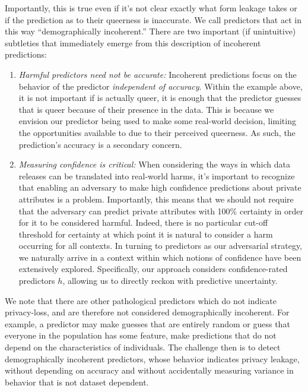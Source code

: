 Importantly, this is true even if it's not clear exactly what form leakage takes or if the  prediction as to their queerness is inaccurate. We call predictors that act in this way ``demographically incoherent.'' There are two important (if unintuitive) subtleties that immediately emerge from this description of incoherent predictions:
\begin{enumerate}[(1),leftmargin=*]
    \item \emph{Harmful predictors need not be accurate:} Incoherent predictions focus on the behavior of the predictor \emph{independent of accuracy}. Within the example above, it is not important if \examplenameone is actually queer, it is enough that the predictor guesses that \examplenameone is queer because of their presence in the data.
    This is because we envision our predictor being used to make some real-world decision, \eg limiting the opportunities available to \examplenameone due to their perceived queerness. As such, the prediction's accuracy is a secondary concern.
    \item \emph{Measuring confidence is critical:}  When considering the ways in which data releases can be translated into real-world harms, it's important to recognize that enabling an adversary to make high confidence predictions about private attributes is a problem. 
    Importantly, this means that we should not require that the adversary can predict private attributes with 100\% certainty in order for it to be considered harmful. 
    Indeed, there is no particular cut-off threshold for certainty at which point it is natural to consider a harm occurring for all contexts.  In turning to predictors as our adversarial strategy, we naturally arrive in a context within which notions of confidence have been extensively explored. 
    Specifically, our approach considers confidence-rated predictors $h$, 
    allowing us to directly reckon with predictive uncertainty.
\end{enumerate}

We note that there are other pathological predictors which do not indicate privacy-loss, and are therefore not considered demographically incoherent. For example, a predictor may make guesses that are entirely random or guess that everyone in the population has some feature, \ie make predictions that do not depend on the characteristics of individuals. The challenge then is to detect demographically incoherent predictors, whose behavior indicates privacy leakage, without depending on accuracy and without accidentally measuring variance in behavior that is not dataset dependent.


